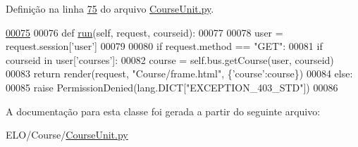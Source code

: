 Definição na linha \hyperlink{CourseUnit_8py_source_l00075}{75} do arquivo \hyperlink{CourseUnit_8py_source}{Course\-Unit.\-py}.


\begin{DoxyCode}
\hypertarget{classCourse_1_1CourseUnit_1_1UiCourse_l00075}{}\hyperlink{classCourse_1_1CourseUnit_1_1UiCourse_aaaf2b8229f2b774f12e719bc0e6f13cb}{00075} 
00076     \textcolor{keyword}{def }\hyperlink{classCourse_1_1CourseUnit_1_1UiCourse_aaaf2b8229f2b774f12e719bc0e6f13cb}{run}(self, request, courseid):
00077         
00078         user = request.session[\textcolor{stringliteral}{'user'}]
00079 
00080         \textcolor{keywordflow}{if} request.method == \textcolor{stringliteral}{"GET"}:
00081             \textcolor{keywordflow}{if} courseid \textcolor{keywordflow}{in} user[\textcolor{stringliteral}{'courses'}]:
00082                 course = self.bus.getCourse(user, courseid)
00083                 \textcolor{keywordflow}{return} render(request, \textcolor{stringliteral}{"Course/frame.html"}, \{\textcolor{stringliteral}{'course'}:course\})
00084             \textcolor{keywordflow}{else}:
00085                 \textcolor{keywordflow}{raise} PermissionDenied(lang.DICT[\textcolor{stringliteral}{"EXCEPTION\_403\_STD"}])
00086         

\end{DoxyCode}


A documentação para esta classe foi gerada a partir do seguinte arquivo\-:\begin{DoxyCompactItemize}
\item 
E\-L\-O/\-Course/\hyperlink{CourseUnit_8py}{Course\-Unit.\-py}\end{DoxyCompactItemize}
